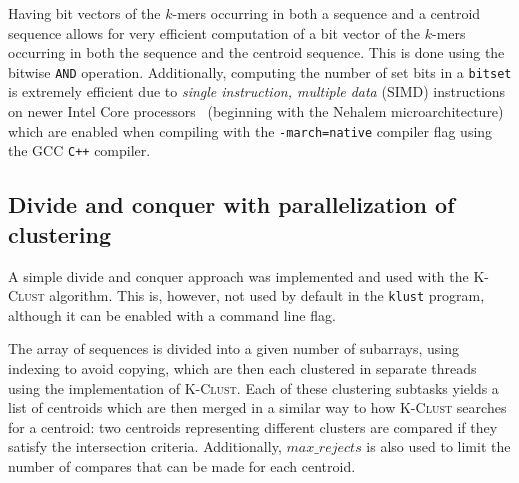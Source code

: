 Having bit vectors of the $k$-mers occurring in both a sequence and a centroid
sequence allows for very efficient computation of a bit vector of the $k$-mers
occurring in both the sequence and the centroid sequence. This is done using
the bitwise \verb|AND| operation. Additionally, computing the number of set
bits in a \verb|bitset| is extremely efficient due to \emph{single instruction,
multiple data} (SIMD) instructions on newer Intel Core processors~\cite{intel}
(beginning with the Nehalem microarchitecture) which are enabled when compiling
with the \verb|-march=native| compiler flag using the GCC \texttt{C++}
compiler.


\subsection{Divide and conquer with parallelization of clustering}

A simple divide and conquer approach was implemented and used with the
\textsc{K-Clust} algorithm. This is, however, not used by default in the
\texttt{klust} program, although it can be enabled with a command line flag.

The array of sequences is divided into a given number of subarrays, using
indexing to avoid copying, which are then each clustered in separate threads
using the implementation of \textsc{K-Clust}.  Each of these clustering
subtasks yields a list of centroids which are then merged in a similar way to
how \textsc{K-Clust} searches for a centroid: two centroids representing
different clusters are compared if they satisfy the intersection criteria.
Additionally, $max\_rejects$ is also used to limit the number of compares that
can be made for each centroid.
